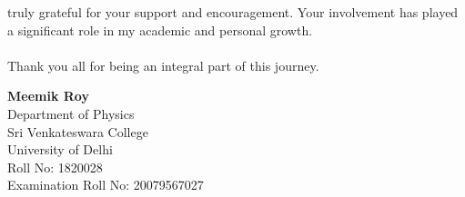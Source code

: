 \documentclass[../Report.tex]{subfiles}
\begin{document}
    truly grateful for your support and encouragement. Your involvement has played a significant role in my 
    academic and personal growth.
    \\~\\
    \noindent 
    Thank you all for being an integral part of this journey.
    \vspace{1in}\\
    \begin{flushleft}
        \textbf{Meemik Roy}\\
        Department of Physics\\
        Sri Venkateswara College\\
        University of Delhi\\
        Roll No: 1820028\\
        Examination Roll No: 20079567027
    \end{flushleft}
\end{document}

